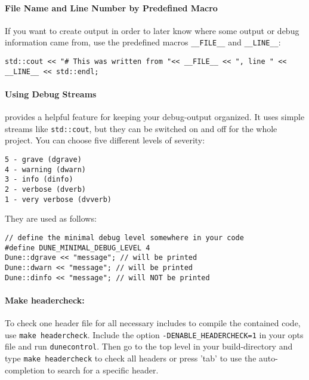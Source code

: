 
\paragraph{File Name and Line Number by Predefined Macro}
If you want to create output in order to later know where some output or debug information came from, use the predefined
macros \texttt{\_\_FILE\_\_} and \texttt{\_\_LINE\_\_}:
\begin{lstlisting}[style=DumuxCode]
std::cout << "# This was written from "<< __FILE__ << ", line " << __LINE__ << std::endl;
\end{lstlisting}

\paragraph{Using \Dune Debug Streams}
\Dune provides a helpful feature for keeping your debug-output organized.
It uses simple streams like \texttt{std::cout}, but they can be switched on and off
for the whole project. You can choose five different levels of severity:
\begin{verbatim}
5 - grave (dgrave)
4 - warning (dwarn)
3 - info (dinfo)
2 - verbose (dverb)
1 - very verbose (dvverb)
\end{verbatim}
\noindent They are used as follows:
\begin{lstlisting}[style=DumuxCode]
// define the minimal debug level somewhere in your code
#define DUNE_MINIMAL_DEBUG_LEVEL 4
Dune::dgrave << "message"; // will be printed
Dune::dwarn << "message"; // will be printed
Dune::dinfo << "message"; // will NOT be printed
\end{lstlisting}

\paragraph{Make headercheck:}
To check one header file for all necessary includes to compile the contained code, use \texttt{make headercheck}.
Include the option \texttt{-DENABLE\_HEADERCHECK=1} in your opts file and run \texttt{dunecontrol}.
Then go to the top level in your build-directory and type \texttt{make headercheck} to check all headers
or press 'tab' to use the auto-completion to search for a specific header.
